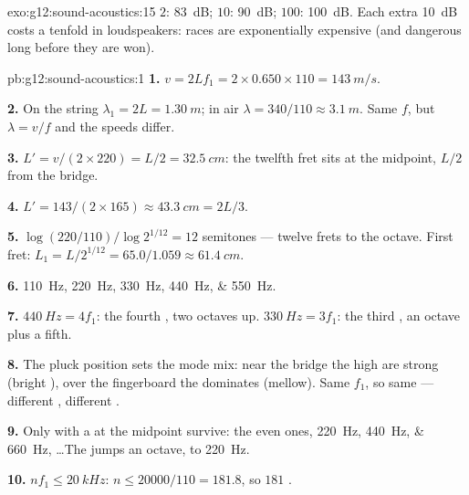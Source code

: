 \begin{solution}{exo:g12:sound-acoustics:15}
$2$: \qty{83}{dB}; $10$: \qty{90}{dB}; $100$: \qty{100}{dB}. Each
extra \qty{+10}{dB} costs a tenfold in loudspeakers:  races
are exponentially expensive (and dangerous long before they are won).
\end{solution}

\begin{solution}{pb:g12:sound-acoustics:1}
\textbf{1.} $v = 2Lf_1 = 2 \times 0.650 \times 110 = \qty{143}{m/s}$.

\textbf{2.} On the string $\lambda_1 = 2L = \qty{1.30}{m}$; in air
$\lambda = 340/110 \approx \qty{3.1}{m}$. Same $f$, but
$\lambda = v/f$ and the  speeds differ.

\textbf{3.} $L' = v/(2 \times 220) = L/2 = \qty{32.5}{cm}$: the
twelfth fret sits at the midpoint, $L/2$ from the bridge.

\textbf{4.} $L' = 143/(2 \times 165) \approx \qty{43.3}{cm} = 2L/3$.

\textbf{5.} $\log(220/110)/\log 2^{1/12} = 12$ semitones --- twelve
frets to the octave. First fret: $L_1 = L/2^{1/12} = 65.0/1.059
\approx \qty{61.4}{cm}$.

\textbf{6.} \qtylist{110;220;330;440;550}{Hz}.

\textbf{7.} $\qty{440}{Hz} = 4f_1$: the fourth , two octaves
up. $\qty{330}{Hz} = 3f_1$: the third , an octave plus a
fifth.

\textbf{8.} The pluck position sets the mode mix: near the bridge the
high  are strong (bright ), over the fingerboard the
 dominates (mellow). Same $f_1$, so same  ---
different , different .

\textbf{9.} Only  with a  at the midpoint survive: the
even ones, \qtylist{220;440;660}{Hz}, \dots The  jumps an
octave, to \qty{220}{Hz}.

\textbf{10.} $nf_1 \le \qty{20}{kHz}$: $n \le 20000/110 = 181.8$,
so $181$ .


\end{solution}
